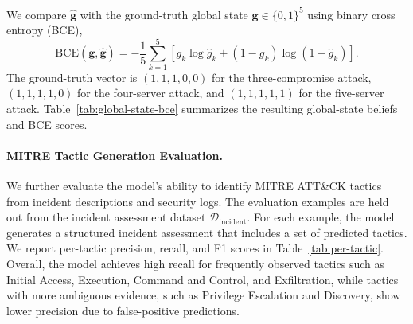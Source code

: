 \documentclass[sigconf]{acmart}
\begin{document}
We compare $\hat{\mathbf g}$ with the ground-truth global state
$\mathbf g\in\{0,1\}^5$ using binary cross entropy (BCE),
\begin{equation*}
    \mathrm{BCE}(\mathbf g,\hat{\mathbf g})
    =
    -\frac{1}{5}\sum_{k=1}^{5}
    \left[
        g_k\log \hat g_k
        +
        (1-g_k)\log(1-\hat g_k)
    \right].
\end{equation*}
The ground-truth vector is $(1,1,1,0,0)$ for the three-compromise attack,
$(1,1,1,1,0)$ for the four-server attack, and $(1,1,1,1,1)$ for the
five-server attack. Table~\ref{tab:global-state-bce} summarizes the resulting
global-state beliefs and BCE scores.

\begin{table}[t]
    \caption{Global compromised-state belief.}
    \label{tab:global-state-bce}
\end{table}

\paragraph{MITRE Tactic Generation Evaluation.}
We further evaluate the model's ability to identify MITRE ATT\&CK tactics from incident descriptions and security logs. The evaluation examples are held out
from the incident assessment dataset $\mathcal{D}_{\mathrm{incident}}$. For each
example, the model generates a structured incident assessment that includes a set of predicted tactics. We report per-tactic precision, recall, and F1 scores
in Table~\ref{tab:per-tactic}. Overall, the model achieves high recall for frequently observed tactics such as Initial Access, Execution, Command and
Control, and Exfiltration, while tactics with more ambiguous evidence, such as Privilege Escalation and Discovery, show lower precision due to false-positive
predictions.
\end{document}
